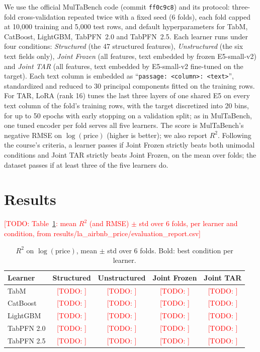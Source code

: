 \documentclass{article}
\newcommand{\todo}[1]{\textcolor{red}{[TODO: #1]}}
\begin{document}
We use the official MulTaBench code (commit \texttt{ff0c9c8}) and its protocol: three-fold cross-validation repeated
twice with a fixed seed (6 folds), each fold capped at 10,000 training and 5,000 test rows, and default
hyperparameters for TabM, CatBoost, LightGBM, TabPFN~2.0 and TabPFN~2.5. Each learner runs under four conditions:
\emph{Structured} (the 47 structured features), \emph{Unstructured} (the six text fields only), \emph{Joint Frozen}
(all features, text embedded by frozen E5-small-v2) and \emph{Joint TAR} (all features, text embedded by E5-small-v2
fine-tuned on the target). Each text column is embedded as ``\texttt{passage: <column>: <text>}'', standardized
and reduced to 30 principal components fitted on the training rows. For TAR, LoRA \cite{hu2022lora} (rank 16) tunes
the last three layers of one shared E5 on every text column of the fold's training rows, with the target
discretized into 20 bins, for up to 50 epochs with early stopping on a validation split; as in MulTaBench, one tuned
encoder per fold serves all five learners. The score is MulTaBench's negative RMSE on $\log(\text{price})$ (higher
is better); we also report $R^2$. Following the course's criteria, a learner passes if Joint Frozen strictly beats
both unimodal conditions and Joint TAR strictly beats Joint Frozen, on the mean over folds; the dataset passes if at
least three of the five learners do.

\section{Results}

\todo{Table~\ref{tab:results}: mean $R^2$ (and RMSE) $\pm$ std over 6 folds, per learner and condition, from
results/la\_airbnb\_price/evaluation\_report.csv}

\begin{table}[h]
  \caption{$R^2$ on $\log(\text{price})$, mean $\pm$ std over 6 folds. Bold: best condition per learner.}
  \label{tab:results}
  \centering
  \begin{tabular}{lcccc}
    \toprule
    Learner & Structured & Unstructured & Joint Frozen & Joint TAR \\
    \midrule
    TabM        & \todo{} & \todo{} & \todo{} & \todo{} \\
    CatBoost    & \todo{} & \todo{} & \todo{} & \todo{} \\
    LightGBM    & \todo{} & \todo{} & \todo{} & \todo{} \\
    TabPFN 2.0  & \todo{} & \todo{} & \todo{} & \todo{} \\
    TabPFN 2.5  & \todo{} & \todo{} & \todo{} & \todo{} \\
    \bottomrule
  \end{tabular}
\end{table}
\end{document}
